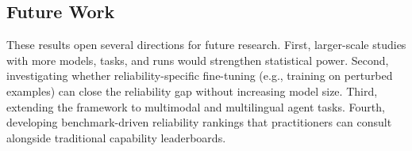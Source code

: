 \subsection{Future Work}

These results open several directions for future research. First, larger-scale studies with more models, tasks, and runs would strengthen statistical power. Second, investigating whether reliability-specific fine-tuning (e.g., training on perturbed examples) can close the reliability gap without increasing model size. Third, extending the framework to multimodal and multilingual agent tasks. Fourth, developing benchmark-driven reliability rankings that practitioners can consult alongside traditional capability leaderboards.
